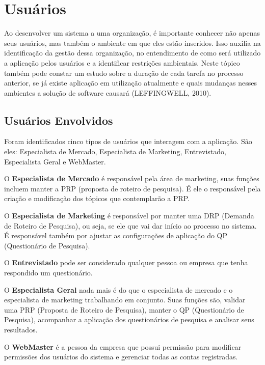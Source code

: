 \section{Usuários}
	Ao desenvolver um sistema a uma organização, é importante conhecer não apenas seus usuários, mas também o ambiente em que eles estão inseridos. Isso auxilia na identificação da gestão dessa organização, no entendimento de como será utilizado a aplicação pelos usuários e a identificar restrições ambientais. Neste tópico também pode constar um estudo sobre a duração de cada tarefa no processo anterior, se já existe aplicação em utilização atualmente e quais mudanças nesses ambientes a solução de software causará (LEFFINGWELL, 2010).

	\subsection{Usuários Envolvidos}
		Foram identificados cinco tipos de usuários que interagem com a aplicação. São eles: Especialista de Mercado, Especialista de Marketing, Entrevistado, Especialista Geral e WebMaster.


		\begin{itemize}
		{

			\item O \textbf{Especialista de Mercado} é responsável pela área de marketing, suas funções incluem manter a PRP (proposta de roteiro de pesquisa). É ele o responsável pela criação e modificação dos tópicos que contemplarão a PRP.
			
			\item O \textbf{Especialista de Marketing} é responsável por manter uma DRP (Demanda de Roteiro de Pesquisa), ou seja, se ele que vai dar início ao processo no sistema.	É responsável também por ajustar as configurações de aplicação do QP (Questionário de Pesquisa).
			
			\item O \textbf{Entrevistado} pode ser considerado qualquer pessoa ou empresa que tenha respondido um questionário.
			
			\item O \textbf{Especialista Geral} nada mais é do que o especialista de mercado e o especialista de marketing trabalhando em conjunto. Suas funções são, validar uma PRP (Proposta de Roteiro de Pesquisa), manter o QP (Questionário de Pesquisa), acompanhar a aplicação dos questionários de pesquisa e analisar seus resultados.
			
			\item O \textbf{WebMaster} é a pessoa da empresa que possui permissão para modificar permissões dos usuários do sistema e gerenciar todas as contas registradas.

		}
		\end{itemize}